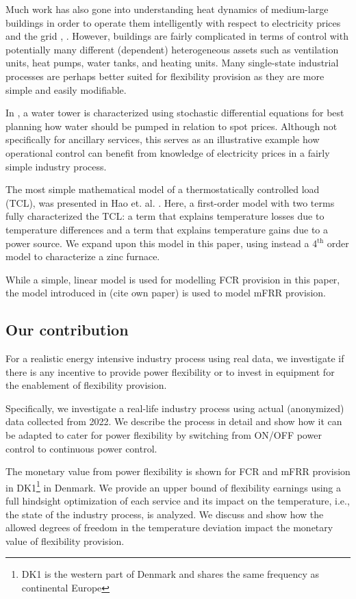 \documentclass[lettersize,journal]{IEEEtran}
\begin{document}
Much work has also gone into understanding heat dynamics of medium-large buildings \cite{thilker2021non} in order to operate them intelligently with respect to electricity prices and the grid \cite{contreras2018tractable}, \cite{finck2018quantifying}. However, buildings are fairly complicated in terms of control with potentially many different (dependent) heterogeneous assets such as ventilation units, heat pumps, water tanks, and heating units. Many single-state industrial processes are perhaps better suited for flexibility provision as they are more simple and easily modifiable.

In \cite{junker2020stochastic}, a water tower is characterized using stochastic differential equations for best planning how water should be pumped in relation to spot prices. Although not specifically for ancillary services, this serves as an illustrative example how operational control can benefit from knowledge of electricity prices in a fairly simple industry process.

The most simple mathematical model of a thermostatically controlled load (TCL), was presented in Hao et. al. \cite{hao2014aggregate}. Here, a first-order model with two terms fully characterized the TCL: a term that explains temperature losses due to temperature differences and a term that explains temperature gains due to a power source. We expand upon this model in this paper, using instead a 4$^{\text{th}}$ order model to characterize a zinc furnace.

While a simple, linear model is used for modelling FCR provision in this paper, the model introduced in (cite own paper) is used to model mFRR provision.



\subsection{Our contribution}

For a realistic energy intensive industry process using real data, we investigate if there is any incentive to provide power flexibility or to invest in equipment for the enablement of flexibility provision.

Specifically, we investigate a real-life industry process using actual (anonymized) data collected from 2022. We describe the process in detail and show how it can be adapted to cater for power flexibility by switching from ON/OFF power control to continuous power control.

The monetary value from power flexibility is shown for FCR and mFRR provision in DK1\footnote{DK1 is the western part of Denmark and shares the same frequency as continental Europe} in Denmark. We provide an upper bound of flexibility earnings using a full hindsight optimization of each service and its impact on the temperature, i.e., the state of the industry process, is analyzed. We discuss and show how the allowed degrees of freedom in the temperature deviation impact the monetary value of flexibility provision.
\end{document}
